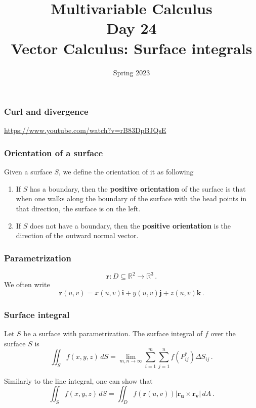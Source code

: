 \documentclass[aspectratio=169]{beamer}
\title{ Multivariable Calculus \\ Day  24 \\ Vector Calculus: Surface integrals}
\date{Spring 2023}
\begin{document}
\maketitle

\begin{frame}
    \frametitle{Curl and divergence}
    \url{https://www.youtube.com/watch?v=rB83DpBJQsE}
\end{frame}


\begin{frame}
    \frametitle{Orientation of a surface}
Given a surface \(S\), we define the orientation of it as following

\begin{enumerate}
\item
  If \(S\) has a boundary, then the \textbf{positive orientation} of the surface is that
  when one walks along the boundary of the surface with the head points in that direction, the surface is on the left.
\item
  If \(S\) does not have a boundary, then the \textbf{positive orientation} is the direction of the outward normal vector.
\end{enumerate}
\end{frame}

\begin{frame}
    \frametitle{Parametrization}
\begin{equation*}
\mathbf{r}: D\subseteq \mathbb{R}^2 \to \mathbb{R}^3 \,.
\end{equation*}
We often write
\begin{equation*}
    \mathbf{r}(u,v) = x(u,v) \mathbf{i} + y(u,v) \mathbf{j} + z(u,v) \mathbf{k} \,.
\end{equation*}

\end{frame}


\begin{frame}
    \frametitle{Surface integral}

\begin{definition}
Let \(S\) be a surface with parametrization.
The surface integral of \(f\) over the surface \(S\) is
\begin{equation*}
    \iint_S f(x,y,z) \, dS = \lim_{m,n\to \infty} \sum_{i=1}^m \sum_{j=1}^n f(P_{ij}^*) \Delta S_{ij} \,.
\end{equation*}
\end{definition}

Similarly to the line integral,
one can show that
\begin{equation*}
   \iint_S f(x,y,z) \, dS  = \iint_D f(\mathbf{r}(u,v)) | \mathbf{r_u}\times \mathbf{r_v} | \, dA \,. 
\end{equation*}
\end{frame}
\end{document}
